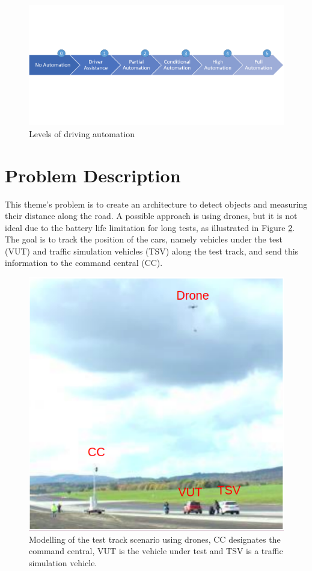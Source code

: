 \begin{figure}[H]
\centering
\includegraphics[scale=0.55]{imagens/diagrama_levels.png}
\caption{Levels of driving automation}
\label{fig:automation}
\end{figure}

\section{Problem Description}

This theme's problem is to create an architecture to detect objects and measuring their distance along the road. A possible approach is using drones, but it is not ideal due to the battery life limitation for long tests, as illustrated in Figure \ref{fig:tests}. The goal is to track the position of the cars, namely vehicles under the test (VUT) and traffic simulation vehicles (TSV) along the test track, and send this information to the command central (CC). 

\begin{figure}[H]
\centering
\includegraphics[scale=0.6]{imagens/proposal.png}
\caption{Modelling of the test track scenario using drones, CC designates the command central, VUT is the vehicle under test and TSV is a traffic simulation vehicle.}
\label{fig:tests}
\end{figure}

